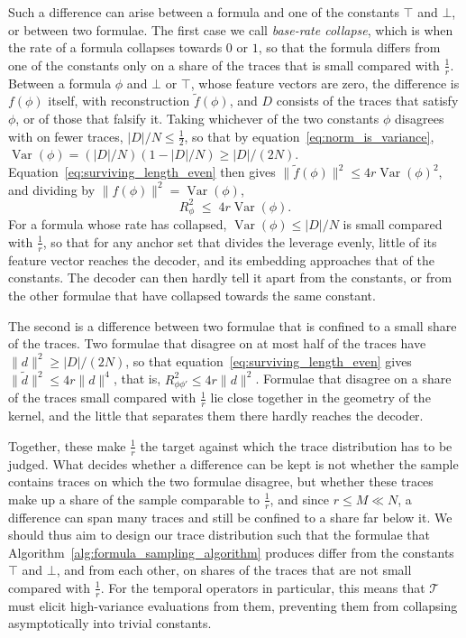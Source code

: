 \documentclass[titlepage,a4paper,11pt]{report}
\begin{document}
    Such a difference can arise between a formula and one of the constants $\top$ and $\bot$, or between two formulae. The first case we call \emph{base-rate collapse}, which is when the rate of a formula collapses towards $0$ or $1$, so that the formula differs from one of the constants only on a share of the traces that is small compared with $\frac1r$. Between a formula $\phi$ and $\bot$ or $\top$, whose feature vectors are zero, the difference is $f(\phi)$ itself, with reconstruction $\tilde f(\phi)$, and $D$ consists of the traces that satisfy $\phi$, or of those that falsify it. Taking whichever of the two constants $\phi$ disagrees with on fewer traces, $|D|/N\le\frac12$, so that by equation~\eqref{eq:norm_is_variance}, $\operatorname{Var}(\phi)=(|D|/N)(1-|D|/N)\ge|D|/(2N)$. Equation~\eqref{eq:surviving_length_even} then gives $\lVert\tilde f(\phi)\rVert^2\le4r\operatorname{Var}(\phi)^2$, and dividing by $\lVert f(\phi)\rVert^2=\operatorname{Var}(\phi)$,
    \begin{equation}\label{eq:retention_variance}
        R^2_\phi\;\le\;4r\operatorname{Var}(\phi).
    \end{equation}
    For a formula whose rate has collapsed, $\operatorname{Var}(\phi)\le|D|/N$ is small compared with $\frac1r$, so that for any anchor set that divides the leverage evenly, little of its feature vector reaches the decoder, and its embedding approaches that of the constants. The decoder can then hardly tell it apart from the constants, or from the other formulae that have collapsed towards the same constant.
 
    The second is a difference between two formulae that is confined to a small share of the traces. Two formulae that disagree on at most half of the traces have $\lVert d\rVert^2\ge|D|/(2N)$, so that equation~\eqref{eq:surviving_length_even} gives $\lVert\tilde d\rVert^2\le4r\lVert d\rVert^4$, that is, $R^2_{\phi\phi'}\le4r\lVert d\rVert^2$. Formulae that disagree on a share of the traces small compared with $\frac1r$ lie close together in the geometry of the kernel, and the little that separates them there hardly reaches the decoder.
 
    Together, these make $\frac1r$ the target against which the trace distribution has to be judged. What decides whether a difference can be kept is not whether the sample contains traces on which the two formulae disagree, but whether these traces make up a share of the sample comparable to $\frac1r$, and since $r\le M\ll N$, a difference can span many traces and still be confined to a share far below it. We should thus aim to design our trace distribution such that the formulae that Algorithm~\ref{alg:formula_sampling_algorithm} produces differ from the constants $\top$ and $\bot$, and from each other, on shares of the traces that are not small compared with $\frac1r$. For the temporal operators in particular, this means that $\mathcal{T}$ must elicit high-variance evaluations from them, preventing them from collapsing asymptotically into trivial constants.
 
\end{document}
